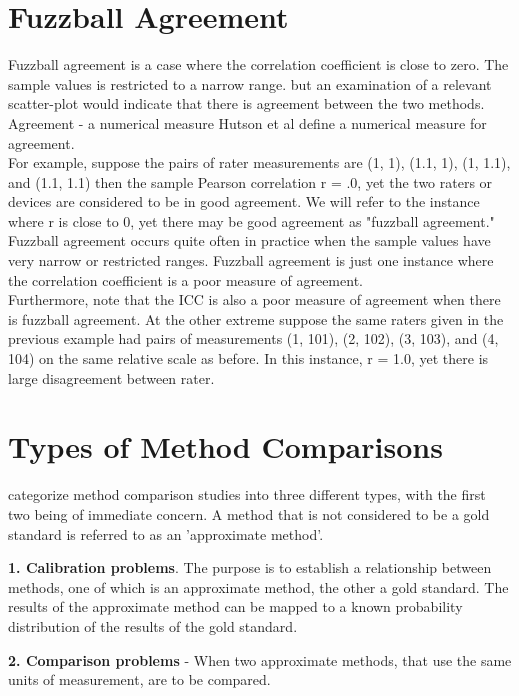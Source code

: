 \section{Fuzzball Agreement}
Fuzzball agreement is a case where the correlation coefficient is close to zero. The sample values is restricted to a narrow range. but an examination of a relevant scatter-plot would indicate that
there is agreement between the two methods.
\\
Agreement - a numerical measure Hutson et al define a numerical measure for agreement.
\\
For example, suppose the pairs of rater measurements are (1, 1), (1.1, 1), (1, 1.1), and (1.1, 1.1) then the sample Pearson correlation r = .0, yet the two raters or devices are considered to be in good agreement. We will refer to the instance where r is close to 0, yet there may be good agreement as "fuzzball agreement." \\Fuzzball agreement occurs quite often in practice when the sample values have very narrow or restricted ranges. Fuzzball agreement is just one instance where the correlation coefficient is a poor measure of agreement. \\Furthermore, note that the ICC is also a poor measure of agreement when there is fuzzball agreement. At the other extreme suppose the same raters given in the previous example had pairs of measurements (1, 101), (2, 102), (3, 103), and (4, 104) on the same relative scale as before. In this instance, r = 1.0, yet there is large disagreement between rater.

\section{Types of Method Comparisons} \citet{Lewis} categorize
method comparison studies into three different types, with the
first two being of immediate concern. A method that is not considered to be a gold standard is referred
to as an 'approximate method'.

\textbf{1. Calibration problems}. The purpose is to establish a
relationship between methods, one of which is an approximate
method, the other a gold standard. The results of the approximate
method can be mapped to a known probability distribution of the
results of the gold standard.

\smallskip
\textbf{2. Comparison problems} - When two approximate methods,
that use the same units of measurement, are to be compared.

